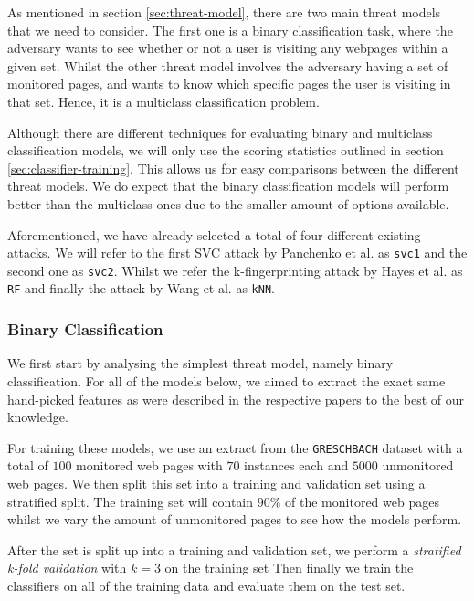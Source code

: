 As mentioned in section \ref{sec:threat-model}, there are two main threat models that we need to consider.
The first one is a binary classification task, where the adversary wants to see whether or not a user is visiting any webpages within a given set.
Whilst the other threat model involves the adversary having a set of monitored pages, and wants to know which specific pages the user is visiting in that set.
Hence, it is a multiclass classification problem.

Although there are different techniques for evaluating binary and multiclass classification models, we will only use the scoring statistics outlined in section \ref{sec:classifier-training}.
This allows us for easy comparisons between the different threat models.
We do expect that the binary classification models will perform better than the multiclass ones due to the smaller amount of options available.

Aforementioned, we have already selected a total of four different existing attacks.
We will refer to the first SVC attack by Panchenko et al. \cite{panchenko1} as \texttt{svc1} and the second one \cite{panchenko2} as \texttt{svc2}.
Whilst we refer the k-fingerprinting attack by Hayes et al. \cite{kfingerprinting} as \texttt{RF} and finally the attack by Wang et al. \cite{wang_cai_johnson_nithyanand_goldberg_2014} as \texttt{kNN}.

\subsubsection{Binary Classification}

We first start by analysing the simplest threat model, namely binary classification.
For all of the models below, we aimed to extract the exact same hand-picked features as were described in the respective papers to the best of our knowledge.

For training these models, we use an extract from the \texttt{GRESCHBACH} dataset with a total of $100$ monitored web pages with $70$ instances each and $5000$ unmonitored web pages.
We then split this set into a training and validation set using a stratified split.
The training set will contain $90\%$ of the monitored web pages whilst we vary the amount of unmonitored pages to see how the models perform.

After the set is split up into a training and validation set, we perform a \textit{stratified k-fold validation} with $k = 3$ on the training set
Then finally we train the classifiers on all of the training data and evaluate them on the test set.

